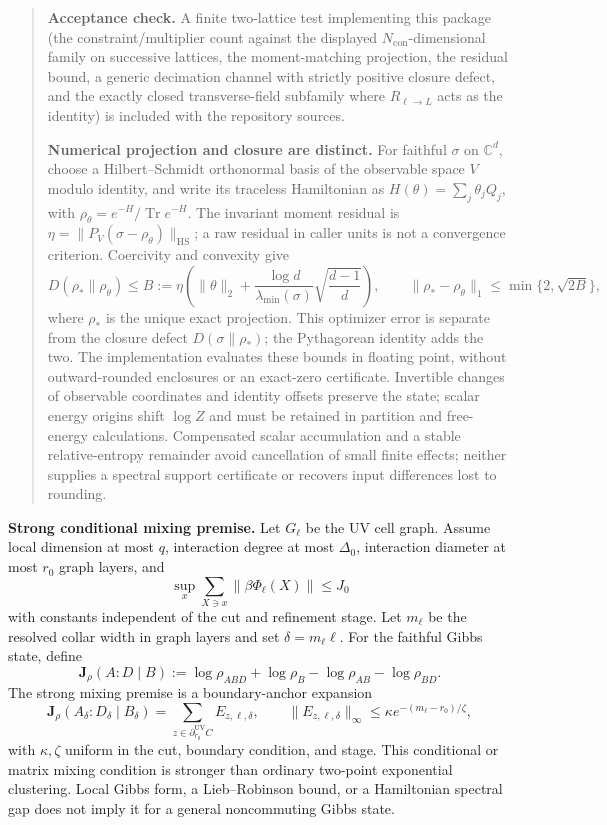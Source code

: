 \begin{quote}
\textbf{Acceptance check.} A finite two-lattice test implementing this package (the constraint/multiplier count against the displayed \(N_{\mathrm{con}}\)-dimensional family on successive lattices, the moment-matching projection, the residual bound, a generic decimation channel with strictly positive closure defect, and the exactly closed transverse-field subfamily where \(R_{\ell\to L}\) acts as the identity) is included with the repository sources.

\textbf{Numerical projection and closure are distinct.} For faithful \(\sigma\) on
\(\mathbb C^d\), choose a Hilbert--Schmidt orthonormal basis of the observable
space \(V\) modulo identity, and write its traceless Hamiltonian as
\(H(\theta)=\sum_j\theta_jQ_j\), with \(\rho_\theta=e^{-H}/\operatorname{Tr}e^{-H}\). The invariant moment residual is
\(\eta=\|P_V(\sigma-\rho_\theta)\|_{\mathrm{HS}}\); a raw residual in caller
units is not a convergence criterion. Coercivity and convexity give
\[
D(\rho_*\|\rho_\theta)\le B:=\eta\left(\|\theta\|_2+
\frac{\log d}{\lambda_{\min}(\sigma)}\sqrt{\frac{d-1}{d}}\right),
\qquad \|\rho_*-\rho_\theta\|_1\le\min\{2,\sqrt{2B}\},
\]
where \(\rho_*\) is the unique exact projection. This optimizer error is
separate from the closure defect \(D(\sigma\|\rho_*)\); the Pythagorean
identity adds the two. The implementation evaluates these bounds in floating
point, without outward-rounded enclosures or an exact-zero certificate.
Invertible changes of observable coordinates and identity offsets preserve
the state; scalar energy origins shift \(\log Z\) and must be retained
in partition and free-energy calculations. Compensated scalar accumulation
and a stable relative-entropy remainder avoid cancellation of small finite
effects; neither supplies a spectral support certificate or recovers input
differences lost to rounding.
\end{quote}

\textbf{Strong conditional mixing premise.} Let \(G_\ell\) be the UV cell graph. Assume local
dimension at most \(q\), interaction degree at most \(\Delta_0\), interaction diameter at most
\(r_0\) graph layers, and
\[
\sup_x\sum_{X\ni x}\|\beta\Phi_\ell(X)\|\le J_0
\]
with constants independent of the cut and refinement stage. Let \(m_\ell\) be the
resolved collar width in graph layers and set \(\delta=m_\ell\ell\). For the faithful Gibbs state, define
\[
\mathbf J_\rho(A:D\mid B)
:=\log\rho_{ABD}+\log\rho_B-\log\rho_{AB}-\log\rho_{BD}.
\]
The strong mixing premise is a boundary-anchor expansion
\[
\mathbf J_\rho(A_\delta:D_\delta\mid B_\delta)
=\sum_{z\in\partial^{\mathrm{UV}}_{r_0}C}E_{z,\ell,\delta},
\qquad
\|E_{z,\ell,\delta}\|_\infty
\le\kappa e^{-(m_\ell-r_0)/\zeta},
\]
with \(\kappa,\zeta\) uniform in the cut, boundary condition, and stage. This conditional or
matrix mixing condition is stronger than ordinary two-point exponential clustering. Local Gibbs
form, a Lieb--Robinson bound, or a Hamiltonian spectral gap does not imply it for a general
noncommuting Gibbs state.

